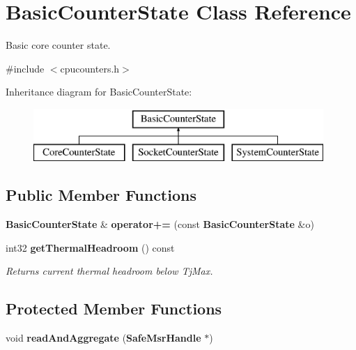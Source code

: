 \section{Basic\+Counter\+State Class Reference}
\label{classBasicCounterState}


Basic core counter state.  




{\ttfamily \#include $<$cpucounters.\+h$>$}

Inheritance diagram for Basic\+Counter\+State\+:\begin{figure}[H]
\begin{center}
\leavevmode
\includegraphics[height=2.000000cm]{classBasicCounterState}
\end{center}
\end{figure}
\subsection*{Public Member Functions}
\begin{DoxyCompactItemize}
\item 
{\bf Basic\+Counter\+State} \& {\bfseries operator+=} (const {\bf Basic\+Counter\+State} \&o)\label{classBasicCounterState_a448f898e8ff78336611db856aa1354db}

\item 
int32 {\bf get\+Thermal\+Headroom} () const \label{classBasicCounterState_a5411f6d468e66da3357a41f3c0fd1cb2}

\begin{DoxyCompactList}\small\item\em Returns current thermal headroom below Tj\+Max. \end{DoxyCompactList}\end{DoxyCompactItemize}
\subsection*{Protected Member Functions}
\begin{DoxyCompactItemize}
\item 
void {\bfseries read\+And\+Aggregate} ({\bf Safe\+Msr\+Handle} $\ast$)\label{classBasicCounterState_a1f983c45cc8e181dfee153a735afbe98}

\end{DoxyCompactItemize}
